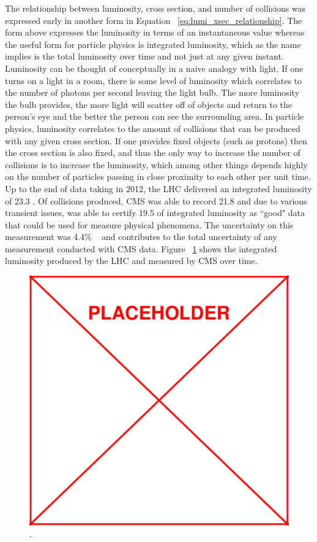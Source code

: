 		The relationship between luminosity, cross section, and number of collisions was expressed early in another form in Equation ~\ref{eq:lumi_xsec_relationship}. The form above expresses the luminosity in terms of an instantaneous value whereas the useful form for particle physics is integrated luminosity, which as the name implies is the total luminosity over time and not just at any given instant. Luminosity can be thought of conceptually in a naive analogy with light. If one turns on a light in a room, there is some level of luminosity which correlates to the number of photons per second leaving the light bulb. The more luminosity the bulb provides, the more light will scatter off of objects and return to the person's eye and the better the person can see the surrounding area. In particle physics, luminosity correlates to the amount of collisions that can be produced with any given cross section. If one provides fixed objects (such as protons) then the cross section is also fixed, and thus the only way to increase the number of collisions is to increase the luminosity, which among other things depends highly on the number of particles passing in close proximity to each other per unit time. \\
		
		Up to the end of data taking in 2012, the LHC delivered an integrated luminosity of 23.3 \fbinv. Of collisions produced, CMS was able to record 21.8 \fbinv and due to various transient issues, was able to certify 19.5 \fbinv of integrated luminosity as ``good" data that could be used for measure physical phenomena. The uncertainty on this measurement was 4.4\% ~\cite{} and contributes to the total uncertainty of any measurement conducted with CMS data. Figure ~\ref{fig:cms_int_lumi} shows the integrated luminosity produced by the LHC and measured by CMS over time.\\
\begin{figure}[h]
\begin{center}
\includegraphics[width=0.48\linewidth]{Figs/placeholder.pdf}
\caption{\label{fig:cms_int_lumi}
.
}
\end{center}
\end{figure}

